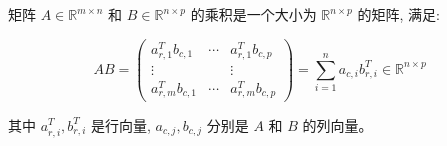 \documentclass[lang=cn,newtx,10pt,scheme=chinese]{elegantbook}
\begin{document}
\begin{definition}[矩阵和矩阵的乘法] \label{def:mat-mat-multi}
    
矩阵 $A \in \mathbb{R}^{m \times n}$ 和 $B \in \mathbb{R}^{n \times p}$ 的乘积是一个大小为 $\mathbb{R}^{n \times p}$ 的矩阵, 满足:

$$
A B=\left(\begin{array}{ccc}
a_{r, 1}^T b_{c, 1} & \cdots & a_{r, 1}^T b_{c, p} \\
\vdots & & \vdots \\
a_{r, m}^T b_{c, 1} & \cdots & a_{r, m}^T b_{c, p}
\end{array}\right)=\sum_{i=1}^n a_{c, i} b_{r, i}^T \in \mathbb{R}^{n \times p}
$$

其中 $a_{r, i}^T, b_{r, i}^T$ 是行向量, $a_{c, j}, b_{c, j}$ 分别是 $A$ 和 $B$ 的列向量。
\end{definition}
\end{document}
